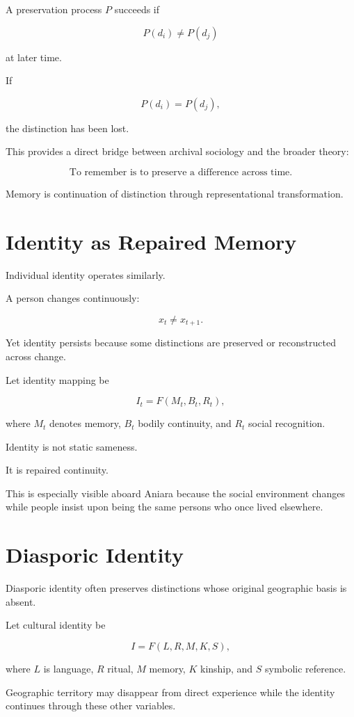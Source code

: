 \documentclass[11pt,oneside]{book}
\theoremstyle{definition}
\theoremstyle{remark}
\begin{document}
A preservation process \(P\) succeeds if

\[
P(d_i)\neq P(d_j)
\]

at later time.

If

\[
P(d_i)=P(d_j),
\]

the distinction has been lost.

This provides a direct bridge between archival sociology and the broader theory:

\[
\boxed{
\text{To remember is to preserve a difference across time.}
}
\]

Memory is continuation of distinction through representational transformation.

\section{Identity as Repaired Memory}

Individual identity operates similarly.

A person changes continuously:

\[
x_t\neq x_{t+1}.
\]

Yet identity persists because some distinctions are preserved or reconstructed across change.

Let identity mapping be

\[
I_t
=
F(M_t,B_t,R_t),
\]

where \(M_t\) denotes memory, \(B_t\) bodily continuity, and \(R_t\) social recognition.

Identity is not static sameness.

It is repaired continuity.

This is especially visible aboard Aniara because the social environment changes while people insist upon being the same persons who once lived elsewhere.

\section{Diasporic Identity}

Diasporic identity often preserves distinctions whose original geographic basis is absent.

Let cultural identity be

\[
I
=
F(L,R,M,K,S),
\]

where \(L\) is language, \(R\) ritual, \(M\) memory, \(K\) kinship, and \(S\) symbolic reference.

Geographic territory may disappear from direct experience while the identity continues through these other variables.
\end{document}
